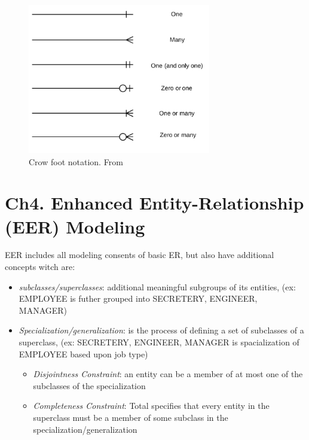 \begin{figure}[!h]
    \centering
    \includegraphics[width=8cm]{image/crow_foot.png}
    \caption{Crow foot notation. From \cite{}}
\end{figure}


\newpage
\section{Ch4. Enhanced Entity-Relationship (EER) Modeling}
EER includes all modeling consents of basic ER, but also have additional concepts witch are:
\begin{itemize}
    \item \textit{subclasses/superclasses}: additional meaningful subgroups of its entities, (ex: EMPLOYEE is futher grouped into SECRETERY, ENGINEER, MANAGER)
    \item \textit{Specialization/generalization}: is the process of defining a set of subclasses of a superclass, (ex: {SECRETERY, ENGINEER, MANAGER} is spacialization of EMPLOYEE based upon job type)
    \begin{itemize}
        \item \textit{Disjointness Constraint}: an entity can be a member of at most one of the subclasses of the specialization
        \item \textit{Completeness Constraint}: Total specifies that every entity in the superclass must be a member of some subclass in the specialization/generalization
    \end{itemize}
\end{itemize} 


